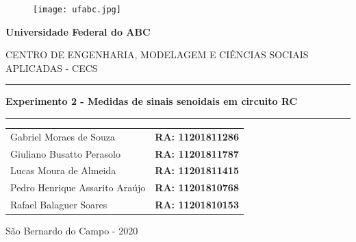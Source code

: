 \documentclass[a4paper,12pt,onecolumn]{article}
\numberwithin{equation}{section}
\numberwithin{figure}{section}
\begin{document}
\begin{figure}[hbtp]
\centering
\texttt{[image: ufabc.jpg]}
\end{figure}

\begin{center}
{\large \textbf{Universidade Federal do ABC}}
\end{center}
\begin{center}
{\scriptsize CENTRO DE ENGENHARIA, MODELAGEM E CIÊNCIAS SOCIAIS APLICADAS - CECS}
\end{center}

\vspace{1cm}

\hrule
\begin{center}
\textbf{Experimento 2 - Medidas de sinais senoidais em circuito RC}
\end{center}
\hrule

\vspace{2cm}

\begin{center}
\begin{tabular}{lc}
Gabriel Moraes de Souza     &   \textbf{RA: 11201811286} \\
Giuliano Busatto Perasolo   &   \textbf{RA: 11201811787} \\
Lucas Moura de Almeida       &  \textbf{RA: 11201811415} \\
Pedro Henrique Assarito Araújo &\textbf{RA: 11201810768} \\
Rafael Balaguer Soares      &   \textbf{RA: 11201810153} \\
\end{tabular}
\end{center}

\vspace{2cm}

\begin{center}
São Bernardo do Campo - 2020
\end{center}

\newpage
\begin{abstract}
O presente experimento tem o propósito de estudar, analisar e discutir um circuito RC série. De modo que é capaz de nos proporcionar um alto nível de entendimento do funcionamento de um capacitor e familiarização com osciloscópio. Visto que é necessário tratar de uma fonte de corrente alternada, ou seja, formas de ondas senoidais, é altamente necessário compreender os chamados fasores, portanto inserindo como objeto de estudo os números complexos.
\end{abstract}
\end{document}
